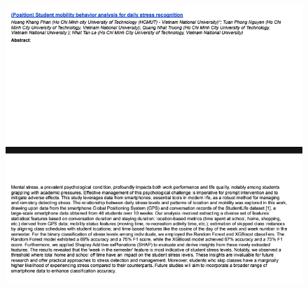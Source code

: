 \documentclass[13pt,a4paper,font=cm]{report}
\theoremstyle{definition}
\begin{document}
\begin{figure}[!ht]
    \centering
    \includegraphics[width=\linewidth]{acb2024.png}
\end{figure}
\end{document}
